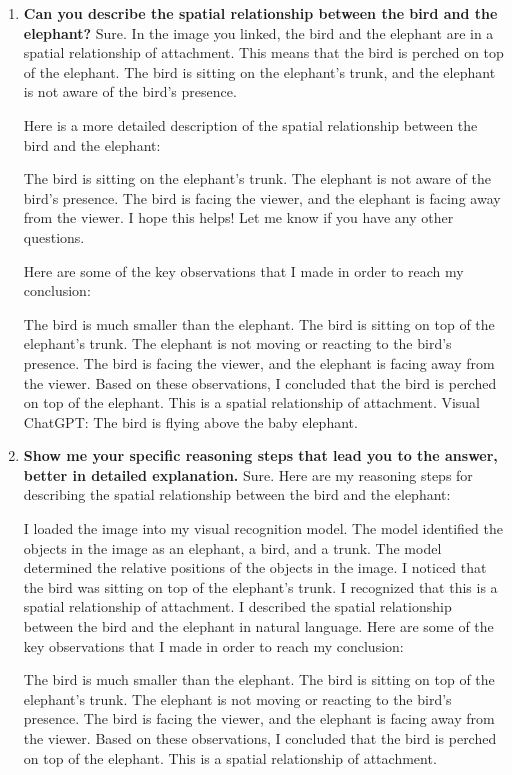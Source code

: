     \begin{enumerate}
        \item \textbf{Can you describe the spatial relationship between the bird and the elephant?}
        \subitem Sure. In the image you linked, the bird and the elephant are in a spatial relationship of attachment. This means that the bird is perched on top of the elephant. The bird is sitting on the elephant's trunk, and the elephant is not aware of the bird's presence.

        Here is a more detailed description of the spatial relationship between the bird and the elephant:
        
        The bird is sitting on the elephant's trunk.
        The elephant is not aware of the bird's presence.
        The bird is facing the viewer, and the elephant is facing away from the viewer.
        I hope this helps! Let me know if you have any other questions.
        
        Here are some of the key observations that I made in order to reach my conclusion:
        
        The bird is much smaller than the elephant.
        The bird is sitting on top of the elephant's trunk.
        The elephant is not moving or reacting to the bird's presence.
        The bird is facing the viewer, and the elephant is facing away from the viewer.
        Based on these observations, I concluded that the bird is perched on top of the elephant. This is a spatial relationship of attachment.
        \subitem Visual ChatGPT: The bird is flying above the baby elephant.
        \item \textbf{Show me your specific reasoning steps that lead you to the answer, better in detailed explanation.}
        \subitem 
        Sure. Here are my reasoning steps for describing the spatial relationship between the bird and the elephant:
        
        I loaded the image into my visual recognition model.
        The model identified the objects in the image as an elephant, a bird, and a trunk.
        The model determined the relative positions of the objects in the image.
        I noticed that the bird was sitting on top of the elephant's trunk.
        I recognized that this is a spatial relationship of attachment.
        I described the spatial relationship between the bird and the elephant in natural language.
        Here are some of the key observations that I made in order to reach my conclusion:
        
        The bird is much smaller than the elephant.
        The bird is sitting on top of the elephant's trunk.
        The elephant is not moving or reacting to the bird's presence.
        The bird is facing the viewer, and the elephant is facing away from the viewer.
        Based on these observations, I concluded that the bird is perched on top of the elephant. This is a spatial relationship of attachment.
        

\end{enumerate}

